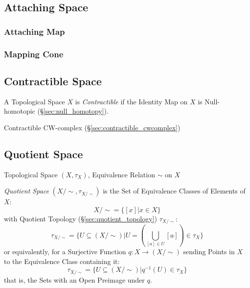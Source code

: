 \subsection{Attaching Space}\label{sec:attaching_space}

\subsubsection{Attaching Map}\label{sec:attaching_map}

\subsubsection{Mapping Cone}\label{sec:mapping_cone}



\subsection{Contractible Space}\label{sec:contractible_space}

A Topological Space $X$ is \emph{Contractible} if the Identity Map on
$X$ is Null-homotopic (\S\ref{sec:null_homotopy}).

Contractible CW-complex (\S\ref{sec:contractible_cwcomplex})



\subsection{Quotient Space}\label{sec:quotient_space}

Topological Space $(X, \tau_X)$, Equivalence Relation $\sim$ on $X$

\emph{Quotient Space} $(X/\sim, \tau_{X/\sim})$ is the Set of Equivalence
Classes of Elements of $X$:
\[
  X / \sim = \{ [x] | x \in X \}
\]
with Quotient Topology (\S\ref{sec:quotient_topology}) $\tau_{X/\sim}$:
\[
  \tau_{X/\sim} = \{ U \subseteq (X/\sim) |
    U = (\bigcup_{[a] \in U} [a]) \in \tau_X \}
\]
or equivalently, for a Surjective Function $q : X \rightarrow (X /
\sim)$ sending Points in $X$ to the Equivalence Class containing it:
\[
  \tau_{X/\sim} = \{ U \subseteq (X/\sim) | q^{-1}(U) \in \tau_X \}
\]
that is, the Sets with an Open Preimage under $q$.

